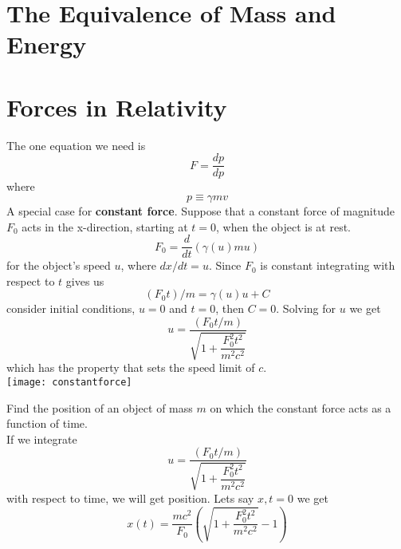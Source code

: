 \section{The Equivalence of Mass and Energy}
\section{Forces in Relativity}
The one equation we need is 
\[ F = \dfrac{dp}{dp} \]
where 
\[ p \equiv \gamma m v \]
A special case for \textbf{constant force}. Suppose that a constant force of magnitude $ F_0 $ acts in the x-direction, starting at $ t = 0 $, when the object is at rest. 
\[ F_0 = \dfrac{d}{dt} (\gamma(u)mu) \]
for the object's speed $ u $, where $ dx/dt = u $. Since $ F_0 $ is constant integrating with respect to $ t $ gives us 
\[ (F_0t)/m = \gamma(u) u + C \]
consider initial conditions, $ u = 0 $ and $ t = 0 $, then $ C = 0 $. Solving for $ u $ we get 
\[ u = \dfrac{(F_0t/m)}{\sqrt{1 + \dfrac{F_0^2t^2}{m^2c^2}}} \]
which has the property that sets the speed limit of $ c $. \\
\texttt{[image: constantforce]}
\begin{example}
	Find the position of an object of mass $ m $ on which the constant force acts as a function of time. \\
	If we integrate
	\[ u = \dfrac{(F_0t/m)}{\sqrt{1 + \dfrac{F_0^2t^2}{m^2c^2}}} \]
	with respect to time, we will get position. Lets say $ x,t = 0 $ we get
	\[ x ( t ) = \frac { m c ^ { 2 } } { F _ { 0 } } \left( \sqrt { 1 + \frac { F _ { 0 } ^ { 2 } t ^ { 2 } } { m ^ { 2 } c ^ { 2 } } } - 1 \right) \]
	
\end{example}





